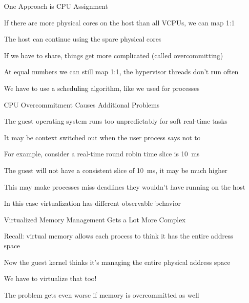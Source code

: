   \begin{frame}{One Approach is CPU Assignment}

    If there are more physical cores on the host than all VCPUs, we can map 1:1

    \hspace{2em} The host can continue using the spare physical cores

    \vspace{2em}

    If we have to share, things get more complicated (called overcommitting)

    \hspace{2em} At equal numbers we can still map 1:1, the hypervisor threads
                 don't run often

    \vspace{2em}

    We have to use a scheduling algorithm, like we used for processes
  \end{frame}

  \begin{frame}{CPU Overcommitment Causes Additional Problems}

    The guest operating system runs too unpredictably for soft real-time tasks

    \hspace{2em} It may be context switched out when the user process says not
    to

    \vspace{2em}

    For example, consider a real-time round robin time slice is 10~ms

    \hspace{2em} The guest will not have a consistent slice of 10~ms, it may be
                 much higher

    \vspace{2em}

    This may make processes miss deadlines they wouldn't have running on the host

    \hspace{2em} In this case virtualization has different observable behavior
  \end{frame}

  \begin{frame}{Virtualized Memory Management Gets a Lot More Complex}

    Recall: virtual memory allows each process to think it has the entire
            address space

    \vspace{2em}

    Now the guest kernel thinks it's managing the entire physical address space

    \hspace{2em} We have to virtualize that too!

    \vspace{2em}

    The problem gets even worse if memory is overcommitted as well
  \end{frame}

